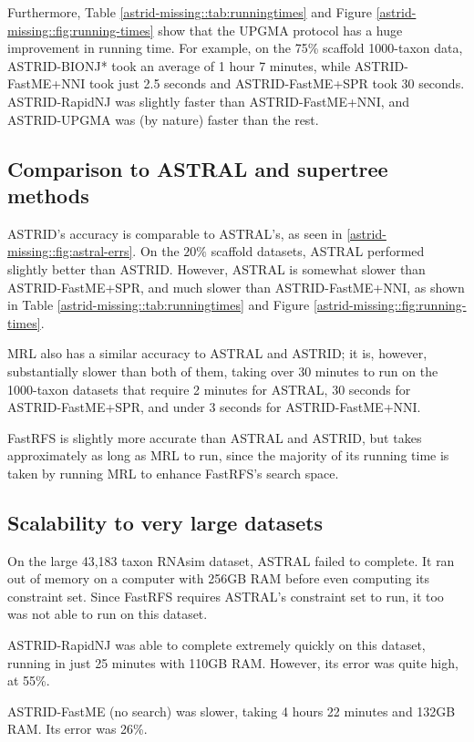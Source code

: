 Furthermore, Table \ref{astrid-missing::tab:runningtimes} and Figure \ref{astrid-missing::fig:running-times} show that the UPGMA protocol has a huge improvement in running time. For example, on the 75\% scaffold 1000-taxon data, ASTRID-BIONJ* took an average of 1 hour 7 minutes, while ASTRID-FastME+NNI took just 2.5 seconds and ASTRID-FastME+SPR took 30 seconds. ASTRID-RapidNJ was slightly faster than ASTRID-FastME+NNI, and ASTRID-UPGMA was (by nature) faster than the rest.

\subsection{Comparison to ASTRAL and supertree methods}

ASTRID's accuracy is comparable to ASTRAL's, as seen in \ref{astrid-missing::fig:astral-errs}. On the $20\%$ scaffold datasets, ASTRAL performed slightly better than ASTRID. However, ASTRAL is somewhat slower than ASTRID-FastME+SPR, and much slower than ASTRID-FastME+NNI, as shown in Table \ref{astrid-missing::tab:runningtimes} and Figure \ref{astrid-missing::fig:running-times}.

MRL also has a similar accuracy to ASTRAL and ASTRID; it is, however, substantially slower than both of them, taking over 30 minutes to run on the 1000-taxon datasets that require 2 minutes for ASTRAL, 30 seconds for ASTRID-FastME+SPR, and under 3 seconds for ASTRID-FastME+NNI. 

FastRFS is slightly more accurate than ASTRAL and ASTRID, but takes approximately as long as MRL to run, since the majority of its running time is taken by running MRL to enhance FastRFS's search space.




\subsection{Scalability to very large datasets}

On the large 43,183 taxon RNAsim dataset, ASTRAL failed to complete. It ran out of memory on a computer with 256GB RAM before even computing its constraint set. Since FastRFS requires ASTRAL's constraint set to run, it too was not able to run on this dataset.

ASTRID-RapidNJ was able to complete extremely quickly on this dataset, running in just 25 minutes with 110GB RAM. However, its error was quite high, at 55\%. 

ASTRID-FastME (no search) was slower, taking 4 hours 22 minutes and 132GB RAM. Its error was 26\%. 

